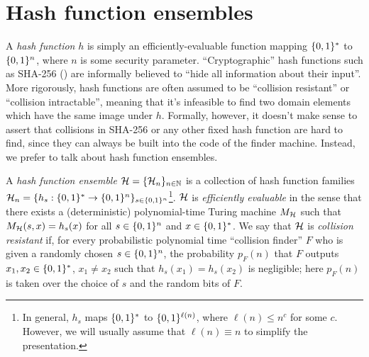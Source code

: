 %

\section{Hash function ensembles}
\label{SEC:Hash}
A {\it hash function} $h$ is simply an efficiently-evaluable function mapping
$\{0,1\}^{*}$ to $\{0,1\}^{n}$, where $n$ is some security parameter.
``Cryptographic'' hash functions such as SHA-256 (\cite{nist:sha1}) are
informally believed to ``hide all information about their input''. 
More rigorously, hash functions are often assumed to be ``collision resistant'' or
``collision intractable'', meaning that it's infeasible to find two domain
elements which have the same image under $h$.  Formally, however, it doesn't
make sense to assert that collisions in SHA-256 or any other fixed
hash function are hard to find, since they can always be built into the code
of the finder machine. 
Instead, we prefer to talk about hash function ensembles.

A {\it hash function ensemble} $\mathcal{H} = \{\mathcal{H}_n\}_{n \in \mathbb{N}}$ is a collection of
hash function families $\mathcal{H}_n = \{h_s : \{0,1\}^{*} \to \{0,1\}^{n}\}_{s \in
\{0,1\}^{n}}$\footnote{In general, $h_s$ maps $\{0,1\}^{*}$ to $\{0,1\}^{\ell(n)}$,
where $\ell(n) \leq n^c$ for some $c$. However, we will usually assume that $\ell(n) \equiv n$ 
to simplify the presentation.}. $\mathcal{H}$ is {\it efficiently
evaluable} in the sense that there exists a (deterministic) polynomial-time
Turing machine $M_{\mathcal{H}}$ such that $M_{\mathcal{H}}(s,x) = h_s(x)$ for all $s \in
\{0,1\}^{n}$ and $x \in \{0,1\}^{*}$. We say that $\mathcal{H}$ is {\it collision
resistant} if, for every probabilistic polynomial time ``collision finder''
$F$ who is given a randomly chosen $s \in \{0,1\}^{n}$, the probability $p_F(n)$
that $F$ outputs $x_1,x_2 \in \{0,1\}^{*}$, $x_1 \neq x_2$ such that $h_s(x_1) =
h_s(x_2)$ is negligible; here $p_F(n)$ is taken over the choice of $s$ and the
random bits of $F$.

